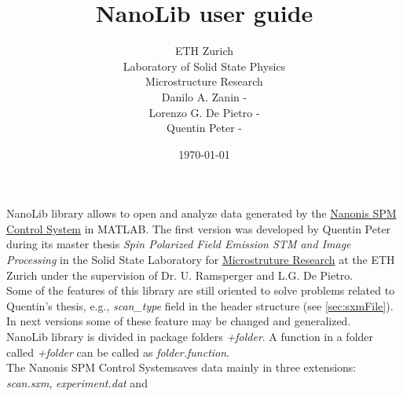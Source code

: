 

\usepackage{amsmath}
\renewcommand{\familydefault}{\sfdefault}
\setlength\parindent{0pt}


\newcommand{\+}[1]{\item \textbf{#1}}

\title{NanoLib user guide}
\author{
ETH Zurich\\
Laboratory of Solid State Physics\\\vspace{.5em}
Microstructure Research\\ 
{\small Danilo A. Zanin - }\\
{\small Lorenzo G. De Pietro - }\\
{\small Quentin Peter - }
}

\date{\today}


\maketitle
NanoLib library allows to open and analyze data generated by the \href{http://www.specs-zurich.com/en/home.html;jsessionid=FCD8A587EE447665C3F4A8CC374671EE}{Nanonis SPM Control System\texttrademark} in MATLAB\texttrademark.
The first version was developed by Quentin Peter during its master thesis \emph{Spin Polarized Field Emission STM and Image Processing} in the Solid State Laboratory for \href{http://www.microstructure.ethz.ch}{Microstruture Research} at the ETH Zurich under the supervision of Dr. U. Ramsperger and L.G. De Pietro.\\
Some of the features of this library are still oriented to solve problems related to Quentin's thesis, e.g., \emph{scan\_type} field in the header structure (see \ref{sec:sxmFile}). 
In next versions some of these feature may be changed and generalized.\\

NanoLib library is divided in package folders \emph{+folder}. 
A function in a folder called \emph{+folder} can be called as \emph{folder.function}.\\
The Nanonis SPM Control System\texttrademark saves data mainly in three extensions: \emph{scan.sxm}, \emph{experiment.dat} and 

